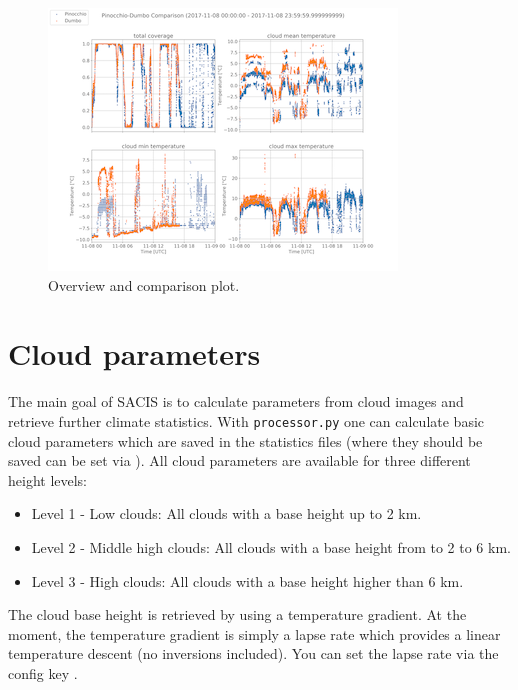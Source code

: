 \documentclass[11pt,a4paper]{article}
\begin{document}
\begin{enumerate}
\begin{figure}
\begin{minipage}{.5\textwidth}
	\end{minipage}%
	\begin{minipage}{.5\textwidth}
  		\centering
  		\includegraphics[width=\linewidth]{figures/comparison.png}
	\end{minipage}
	\caption{Overview and comparison plot.}
	\label{fig:plots}
\end{figure}
	
\end{enumerate}

\section{Cloud parameters}
\label{sec:cloud-parameters}
The main goal of SACIS is to calculate parameters from cloud images and retrieve further climate statistics. With \texttt{processor.py} one can calculate basic cloud parameters which are saved in the statistics files (where they should be saved can be set via ). All cloud parameters are available for three different height levels:
\begin{itemize}
	\item Level 1 - Low clouds: All clouds with a base height up to 2 km.
	\item Level 2 - Middle high clouds: All clouds with a base height from to 2 to 6 km.
	\item Level 3 - High clouds: All clouds with a base height higher than 6 km.
\end{itemize}

The cloud base height is retrieved by using a temperature gradient. At the moment, the temperature gradient is simply a lapse rate which provides a linear temperature descent (no inversions included). You can set the lapse rate via the config key .
\end{document}
